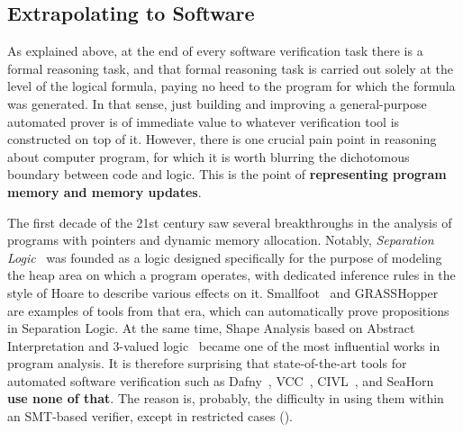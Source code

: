 \subsection{Extrapolating to Software}

As explained above, at the end of every software verification task there is a formal reasoning task, and that formal reasoning task is carried out solely at the level of the logical formula, paying no heed to the program for which the formula was generated.
In that sense, just building and improving a general-purpose automated prover is of immediate value to whatever verification tool is constructed on top of it.
However, there is one crucial pain point in reasoning about computer program, for which it is worth blurring the dichotomous boundary between code and logic.
This is the point of \textbf{representing program memory and memory updates}.

The first decade of the 21st century saw several breakthroughs in the analysis of programs with pointers and dynamic memory allocation.
Notably, \emph{Separation Logic}~\cite{LICS2002:Reynolds} was founded as a logic designed specifically for the purpose of modeling the heap area on which a program operates,
with dedicated inference rules in the style of Hoare to describe various effects on it.
Smallfoot~\cite{FMCO2005:Berdine} and GRASSHopper~\cite{TACAS2014:Piskac,CAV2014:Piskac} are examples of tools from that era, which can automatically prove propositions in Separation Logic.
At the same time, Shape Analysis based on Abstract Interpretation and 3-valued logic~\cite{CAV2014:Reps} became one of the most influential works in program analysis.
It is therefore surprising that state-of-the-art tools for automated software verification such as Dafny~\cite{LPAR2010:Leino}, VCC~\cite{vcc}, CIVL~\cite{CAV2015:Hawblitzel}, and SeaHorn~\cite{CAV2015:Gurfinkel} \textbf{use none of that}.
The reason is, probably, the difficulty in using them within an SMT-based verifier, except in restricted cases
(\eg \cite{CAV2013:Piskac}).

